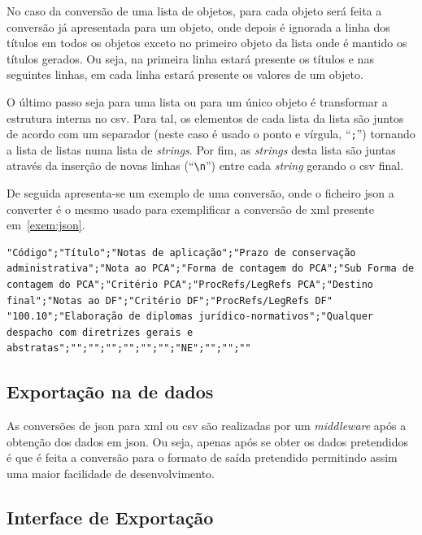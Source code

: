 No caso da conversão de uma lista de objetos, para cada objeto será feita a conversão já apresentada para um objeto, onde depois é ignorada a linha dos títulos em todos os objetos exceto no primeiro objeto da lista onde é mantido os títulos gerados. Ou seja, na primeira linha estará presente os títulos e nas seguintes linhas, em cada linha estará presente os valores de um objeto.

O último passo seja para uma lista ou para um único objeto é transformar a estrutura interna no \acrshort{csv}. Para tal, os elementos de cada lista da lista são juntos de acordo com um separador (neste caso é usado o ponto e vírgula, ``\texttt{;}'') tornando a lista de listas numa lista de \textit{strings}. Por fim, as \textit{strings} desta lista são juntas através da inserção de novas linhas (``\texttt{\textbackslash{}n}'') entre cada \textit{string} gerando o \acrshort{csv} final.

De seguida apresenta-se um exemplo de uma conversão, onde o ficheiro \acrshort{json} a converter é o mesmo usado para exemplificar a conversão de \acrshort{xml} presente em~\ref{exem:json}.

\begin{lstlisting}[language=pseudocode, caption=\acrshort{csv} resultante da conversão do \acrshort{json} presente em~\ref{exem:json}]
"Código";"Título";"Notas de aplicação";"Prazo de conservação administrativa";"Nota ao PCA";"Forma de contagem do PCA";"Sub Forma de contagem do PCA";"Critério PCA";"ProcRefs/LegRefs PCA";"Destino final";"Notas ao DF";"Critério DF";"ProcRefs/LegRefs DF"
"100.10";"Elaboração de diplomas jurídico-normativos";"Qualquer despacho com diretrizes gerais e abstratas";"";"";"";"";"";"";"NE";"";"";""
\end{lstlisting}

\subsection{Exportação na  de dados}

As conversões de \acrshort{json} para \acrshort{xml} ou \acrshort{csv} são realizadas por um \textit{middleware} após a obtenção dos dados em \acrshort{json}. Ou seja, apenas após se obter os dados pretendidos é que é feita a conversão para o formato de saída pretendido permitindo assim uma maior facilidade de desenvolvimento.

\subsection{Interface de Exportação}

